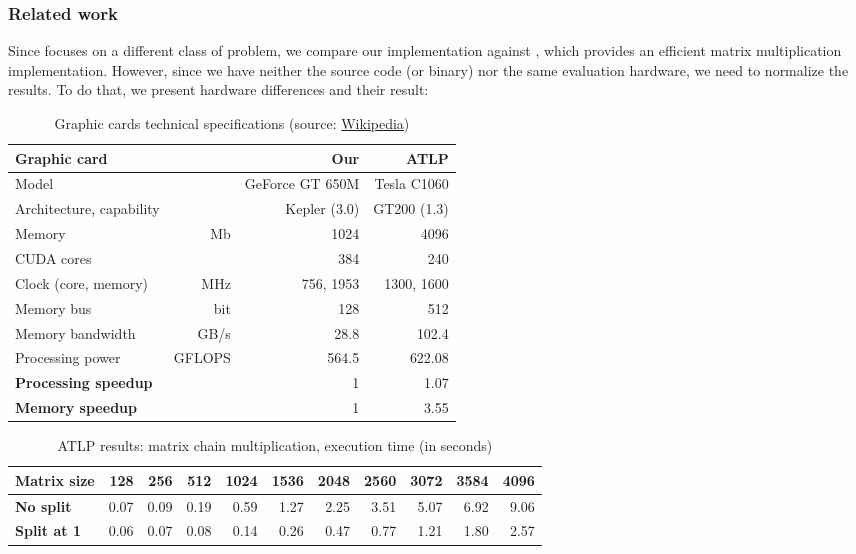 \subsubsection{Related work}
Since \cite{swat_mega} focuses on a different class of problem, we compare our implementation against \cite{gpu_atlp}, which provides an efficient matrix multiplication implementation. However, since we have neither the source code (or binary) nor the same evaluation hardware, we need to normalize the results. To do that, we present hardware differences and their result:

\def\unt#1{& \footnotesize #1}
\begin{table}[H]\begin{center}\begin{tabular}{lrrr} \toprule
\bf Graphic card &				& \bf Our 		& \bf  ATLP\cite{gpu_atlp} \\ \midrule
Model &						& GeForce GT 650M	& Tesla C1060 \\
Architecture, capability  &			& Kepler (3.0)	& GT200 (1.3) \\
Memory \unt{Mb}				& 1024		& 4096 \\
CUDA cores &					& 384		& 240 \\
Clock (core, memory) \unt{MHz}	& 756, 1953	& 1300, 1600 \\
Memory bus \unt{bit}				& 128		& 512 \\
Memory bandwidth \unt{GB/s}		& 28.8		& 102.4 \\
Processing power \unt{GFLOPS}	&564.5		& 622.08 \\ \midrule
\bf Processing speedup & 		& 1			& 1.07 \\
\bf Memory speedup & 			& 1			& 3.55 \\ \bottomrule
\end{tabular}\end{center}\caption{Graphic cards technical specifications (source: \href{http://en.wikipedia.org/wiki/Comparison_of_Nvidia_graphics_processing_units}{Wikipedia})}\end{table}

\begin{table}[H]\begin{center}\begin{tabular}{lrrrrrrrrrr} \toprule
\bf Matrix size & 128 & 256 & 512 & 1024 & 1536 & 2048 & 2560 & 3072 & 3584 & 4096 \\ \midrule
\bf No split & 0.07 & 0.09 & 0.19 & 0.59 & 1.27 & 2.25 & 3.51 & 5.07 & 6.92 & 9.06 \\
\bf Split at 1 & 0.06 & 0.07 & 0.08 & 0.14 & 0.26 & 0.47 & 0.77 & 1.21 & 1.80 & 2.57 \\ \bottomrule
\end{tabular}\end{center}\caption{ATLP\cite{gpu_atlp} results: matrix chain multiplication, execution time (in seconds)}\end{table}

